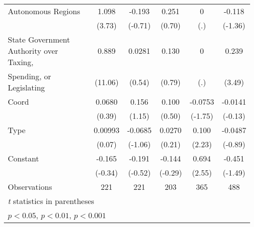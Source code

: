\begin{table}[htbp]
\begin{tabular}{l*{5}{c}}
Autonomous Regions                      &    1.098\sym{**} &   -0.193         &    0.251         &        0         &   -0.118         \\
                                        &   (3.73)         &  (-0.71)         &   (0.70)         &      (.)         &  (-1.36)         \\
\addlinespace
State Government Authority over Taxing, &    0.889\sym{***}&   0.0281         &    0.130         &        0         &    0.239\sym{**} \\
Spending, or Legislating                &  (11.06)         &   (0.54)         &   (0.79)         &      (.)         &   (3.49)         \\
\addlinespace
Coord                                   &   0.0680         &    0.156         &    0.100         &  -0.0753         &  -0.0141         \\
                                        &   (0.39)         &   (1.15)         &   (0.50)         &  (-1.75)         &  (-0.13)         \\
\addlinespace
Type                                    &  0.00993         &  -0.0685         &   0.0270         &    0.100\sym{*}  &  -0.0487         \\
                                        &   (0.07)         &  (-1.06)         &   (0.21)         &   (2.23)         &  (-0.89)         \\
\addlinespace
Constant                                &   -0.165         &   -0.191         &   -0.144         &    0.694\sym{*}  &   -0.451         \\
                                        &  (-0.34)         &  (-0.52)         &  (-0.29)         &   (2.55)         &  (-1.49)         \\
\midrule
Observations                            &      221         &      221         &      203         &      365         &      488         \\
\bottomrule
\multicolumn{6}{l}{\footnotesize \textit{t} statistics in parentheses}\\
\multicolumn{6}{l}{\footnotesize \sym{*} \(p<0.05\), \sym{**} \(p<0.01\), \sym{***} \(p<0.001\)}\\
\end{tabular}
\end{table}
